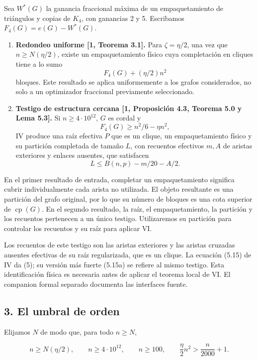 \documentclass[spanish,11pt,a4paper]{article}
\providecommand{\tightlist}{\setlength{\itemsep}{0pt}\setlength{\parskip}{0pt}}
\begin{document}
Sea \(W^*(G)\) la ganancia fraccional máxima de un empaquetamiento de
triángulos y copias de \(K_4\), con ganancias 2 y 5. Escribamos
\(F_4(G)=e(G)-W^*(G)\).

\begin{enumerate}
\def\labelenumi{\arabic{enumi}.}
\tightlist
\item
  \textbf{Redondeo uniforme {[}1, Teorema 3.1{]}.} Para
  \(\zeta=\eta/2\), una vez que \(n\ge N(\eta/2)\), existe un
  empaquetamiento físico cuya completación en cliques tiene a lo sumo \[
  F_4(G)+(\eta/2)n^2
  \] bloques. Este resultado se aplica uniformemente a los grafos
  considerados, no solo a un optimizador fraccional previamente
  seleccionado.
\item
  \textbf{Testigo de estructura cercana {[}1, Proposición 4.3, Teorema
  5.0 y Lema 5.3{]}.} Si \(n\ge4\cdot10^{12}\), \(G\) es cordal y \[
  F_4(G)\ge n^2/6-\eta n^2,
  \] IV produce una raíz efectiva \(P\) que es un clique, un
  empaquetamiento físico y su partición completada de tamaño \(L\), con
  recuentos efectivos \(m,A\) de aristas exteriores y enlaces ausentes,
  que satisfacen \[
  L\le B(n,p)-m/20-A/2.
  \tag{5}
  \]
\end{enumerate}

En el primer resultado de entrada, completar un empaquetamiento
significa cubrir individualmente cada arista no utilizada. El objeto
resultante es una partición del grafo original, por lo que su número de
bloques es una cota superior de \(\operatorname{cp}(G)\). En el segundo
resultado, la raíz, el empaquetamiento, la partición y los recuentos
pertenecen a un único testigo. Utilizaremos su partición para controlar
los recuentos y su raíz para aplicar VI.

Los recuentos de este testigo son las aristas exteriores y las aristas
cruzadas ausentes efectivas de su raíz regularizada, que es un clique.
La ecuación (5.15) de IV da (5); su versión más fuerte (5.15a) se
refiere al mismo testigo. Esta identificación física es necesaria antes
de aplicar el teorema local de VI. El companion formal separado
documenta las interfaces fuente.

\subsection{3. El umbral de orden}\label{el-umbral-de-orden}

Elijamos \(N\) de modo que, para todo \(n\ge N\),

\[
n\ge N(\eta/2),\qquad n\ge4\cdot10^{12},\qquad n\ge100,
\qquad \frac\eta2n^2>\frac n{2000}+1.
\tag{6}
\]
\end{document}
